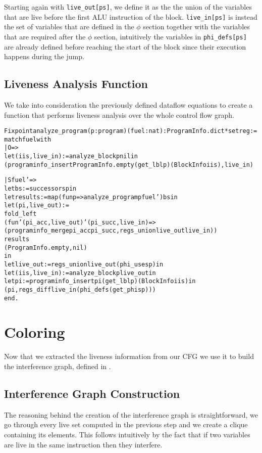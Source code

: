 Starting again with \texttt{live\_out[ps]}, we define it as the the union of the variables that are live before the first ALU instruction of the block. \texttt{live\_in[ps]} is instead the set of variables that are defined in the $\phi$ section together with the variables that are required after the $\phi$ section, intuitively the variables in \texttt{phi\_defs[ps]} are already defined before reaching the start of the block since their execution happens during the jump.

\subsection{Liveness Analysis Function}

We take into consideration the previously defined dataflow equations to create a function that performs liveness analysis over the whole control flow graph.

\begin{alltt}
Fixpoint analyze_program (p : program) (fuel : nat) : ProgramInfo.dict * set reg :=
  match fuel with
  | O =>
    let (iis, live_in) := analyze_block p nil in
    (programinfo_insert ProgramInfo.empty (get_lbl p) (BlockInfo iis), live_in)

  | S fuel' =>
    let bs := successors p in
    let results := map (fun p => analyze_program p fuel') bs in
    let (pi, live_out) :=
      fold_left
        (fun '(pi_acc, live_out) '(pi_succ, live_in) =>
          (programinfo_merge pi_acc pi_succ, regs_union live_out live_in))
        results
        (ProgramInfo.empty, nil)
    in
    let live_out := regs_union live_out (phi_uses p) in
    let (iis, live_in) := analyze_block p live_out in
    let pi := programinfo_insert pi (get_lbl p) (BlockInfo iis) in
    (pi, regs_diff live_in (phi_defs (get_phis p)))
  end.
\end{alltt}

\section{Coloring}

Now that we extracted the liveness information from our CFG we use it to build the interference graph, defined in .

\subsection{Interference Graph Construction}

The reasoning behind the creation of the interference graph is straightforward, we go through every live set computed in the previous step and we create a clique containing its elements. This follows intuitively by the fact that if two variables are live in the same instruction then they interfere.

